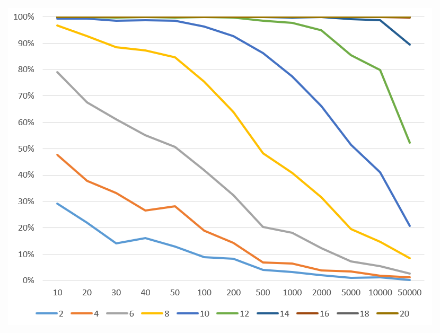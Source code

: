 \begin{figure}[h]
\begin{minipage}[b]{0.45\textwidth}
            \includegraphics[width=\textwidth]{figures/images/solvabilityOfInputs/solvability0_2.png}
      \end{minipage}
\end{figure}


